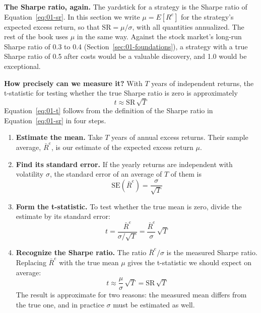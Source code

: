 \textbf{The Sharpe ratio, again.} The yardstick for a strategy is the Sharpe ratio of Equation~\eqref{eq:01-sr}. In this section we write $\mu = E[R^{e}]$ for the strategy's expected excess return, so that $\mathrm{SR} = \mu/\sigma$, with all quantities annualized. The rest of the book uses $\mu$ in the same way. Against the stock market's long-run Sharpe ratio of 0.3 to 0.4 (Section~\ref{sec:01-foundations}), a strategy with a true Sharpe ratio of 0.5 after costs would be a valuable discovery, and 1.0 would be exceptional.

\textbf{How precisely can we measure it?} With $T$ years of independent returns, the t-statistic for testing whether the true Sharpe ratio is zero is approximately
\begin{equation}
  t \approx \mathrm{SR}\,\sqrt{T}
  \label{eq:01-t}
\end{equation}
Equation~\eqref{eq:01-t} follows from the definition of the Sharpe ratio in Equation~\eqref{eq:01-sr} in four steps.

\begin{enumerate}
  \item \textbf{Estimate the mean.} Take $T$ years of annual excess returns. Their sample average, $\bar{R}^{e}$, is our estimate of the expected excess return $\mu$.
  \item \textbf{Find its standard error.} If the yearly returns are independent with volatility $\sigma$, the standard error of an average of $T$ of them is
  \begin{equation}
    \mathrm{SE}(\bar{R}^{e}) = \frac{\sigma}{\sqrt{T}} \nonumber
  \end{equation}
  \item \textbf{Form the t-statistic.} To test whether the true mean is zero, divide the estimate by its standard error:
  \begin{equation}
    t = \frac{\bar{R}^{e}}{\sigma/\sqrt{T}} = \frac{\bar{R}^{e}}{\sigma}\,\sqrt{T} \nonumber
  \end{equation}
  \item \textbf{Recognize the Sharpe ratio.} The ratio $\bar{R}^{e}/\sigma$ is the measured Sharpe ratio. Replacing $\bar{R}^{e}$ with the true mean $\mu$ gives the t-statistic we should expect on average:
  \begin{equation}
    t \approx \frac{\mu}{\sigma}\,\sqrt{T} = \mathrm{SR}\,\sqrt{T} \nonumber
  \end{equation}
  The result is approximate for two reasons: the measured mean differs from the true one, and in practice $\sigma$ must be estimated as well.
\end{enumerate}

